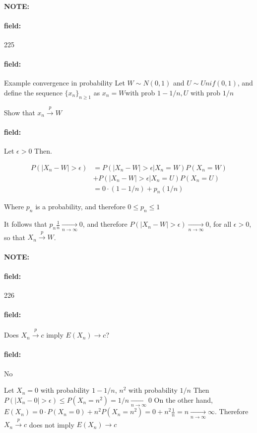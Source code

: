 \documentclass[12pt]{article}
\newenvironment{note}{\paragraph{NOTE:}}{}
\newenvironment{field}{\paragraph{field:}}{}
\begin{document}
\begin{note} \begin{field} \tiny 225 \end{field}
  \begin{field}
    Example convergence in probability
    Let $W \sim N(0,1)$ and $U \sim Unif(0,1)$, and define the sequence $\{x_n\}_{n \geq 1}$ as $x_n = W $with prob $1 - 1/n, U$ with prob $ 1/n$

    Show that $x_n \overset{p}{\to} W $

  \end{field}
  \begin{field}
    Let $\epsilon > 0$ Then.

    \begin{align*}
      P(|X_n - W| > \epsilon) &= P(|X_n - W| > \epsilon | X_n = W)P(X_n = W) \\
      &+ P(|X_n - W| > \epsilon | X_n = U)P(X_n = U)\\
      &= 0 \cdot (1 - 1/n) + p_n (1/n)
    \end{align*}

    Where $p_n  $ is a probability, and therefore $0 \leq p_n \leq 1 $

    It follows that $p_n \frac{1}{n} \underset{n \to \infty}{\to} 0$, and therefore $P(|X_n - W| > \epsilon ) \underset{n \to \infty}{\to} 0$, for all $\epsilon > 0$, so that $X_n \overset{p}{\to} W$.
  \end{field}
\end{note}

\begin{note} \begin{field} \tiny 226 \end{field}
  \begin{field}
    Does $X_n \overset{p}{\to} c$ imply $E(X_n) \to c $?
  \end{field}
  \begin{field}
    No


    Let $X_n = 0$ with probability $1 - 1/n$, $n^2 $ with probability $1/n$
    Then $P(|X_n - 0| > \epsilon) \leq P(X_n = n^2) = 1/n \underset{n \to \infty}{\to} 0$
    On the other hand,
    $E(X_n) = 0 \cdot P(X_n =0) + n^2P(X_n = n^2) = 0 + n^2 \frac{1}{n} = n \underset{n \to \infty}{\to} \infty$.
    Therefore $X_n \overset{p}{\to} c$ does not imply $E(X_n) \to c $
  \end{field}
\end{note}
\end{document}

